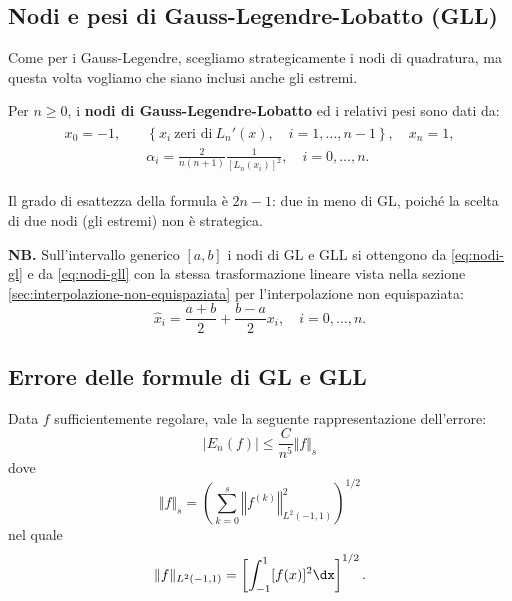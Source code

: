 \subsection{Nodi e pesi di Gauss-Legendre-Lobatto (GLL)}
Come per i Gauss-Legendre, scegliamo strategicamente i nodi di quadratura, ma questa volta vogliamo che siano inclusi anche gli estremi.

Per $n\geqslant 0$, i \textbf{nodi di Gauss-Legendre-Lobatto} ed i relativi pesi sono dati da:
\begin{gather}
\begin{split}
x_{0} =-1,\quad &\left\{x_{i} \ \text{zeri di} \ L_{n} '(x) ,\quad i=1,\dotsc ,n-1\right\} ,\quad x_{n} =1,\\
&\alpha _{i} =\frac{2}{n( n+1)}\frac{1}{[ L_{n}( x_{i})]^{2}} ,\quad i=0,\dotsc ,n.
\end{split}
\label{eq:nodi-gll}
\end{gather}

Il grado di esattezza della formula è $2n-1$: due in meno di GL, poiché la scelta di due nodi (gli estremi) non è strategica.

\textbf{NB.}
Sull'intervallo generico $[ a,b]$ i nodi di GL e GLL si ottengono da \eqref{eq:nodi-gl} e da \eqref{eq:nodi-gll} con la stessa trasformazione lineare vista nella sezione \ref{sec:interpolazione-non-equispaziata} per l'interpolazione non equispaziata:
\begin{equation*}
\hat{x}_{i} =\frac{a+b}{2} +\frac{b-a}{2} x_{i}, \quad i=0,\dotsc ,n.
\end{equation*}

\subsection{Errore delle formule di GL e GLL}
Data $f$ sufficientemente regolare, vale la seguente rappresentazione dell'errore:
\begin{equation*}
| E_{n}(f)| \leqslant \frac{C}{n^{5}}\Vert f\Vert _{s}
\end{equation*}
dove
\begin{equation*}
\Vert f\Vert _{s} =\left(\sum\limits ^{s}_{k=0}\left\Vert f^{(k)}\right\Vert ^{2}_{L^{2}( -1,1)}\right)^{1/2}
\end{equation*}
nel quale
\begin{equation*}
\Vert f\Vert _{L^{2}( -1,1)} =\left[\int\nolimits ^{1}_{-1}[ f(x)]^{2} \dx\right]^{1/2} .
\end{equation*}

